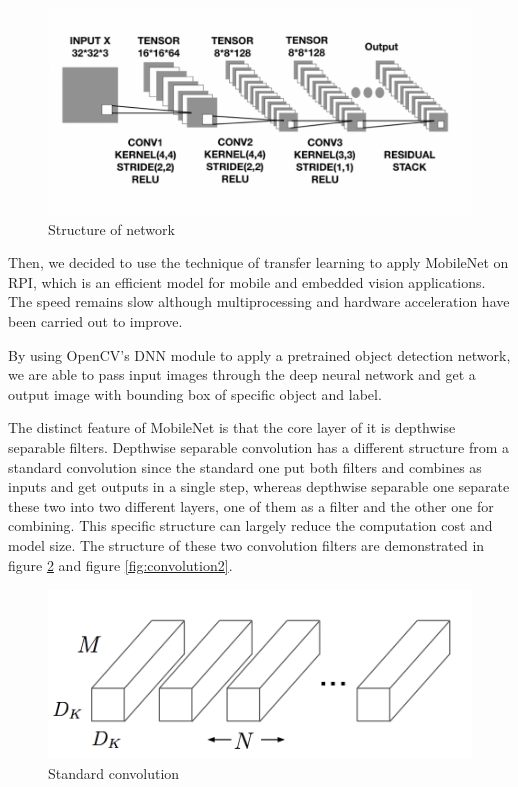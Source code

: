 \documentclass[11pt, titlepage]{article} %
\begin{document}
\begin{figure}[]
	\centering
  	\includegraphics[scale=0.6]{network.png}
   	\caption{Structure of network}
   	\label{fig:network}
\end{figure}

Then, we decided to use the technique of transfer learning to apply MobileNet on RPI, which is an efficient model for mobile and embedded vision applications. The speed remains slow although multiprocessing and hardware acceleration have been carried out to improve.

By using OpenCV’s DNN module to apply a pretrained object detection network, we are able to pass input images through the deep neural network and get a output image with bounding box of specific object and label.

The distinct feature of MobileNet is that the core layer of it is depthwise separable filters. Depthwise separable convolution has a different structure from a standard convolution since the standard one put both filters and combines as inputs and get outputs in a single step, whereas depthwise separable one separate these two into two different layers, one of them as a filter and the other one for combining. This specific structure can largely reduce the computation cost and model size. The structure of these two convolution filters are demonstrated in figure \ref{fig:convolution1} and figure \ref{fig:convolution2}.

\begin{figure}[]
	\centering
   	\includegraphics[scale=0.5]{convolution1.png}
   	\caption{Standard convolution}
   	\label{fig:convolution1}
\end{figure}
\end{document}
